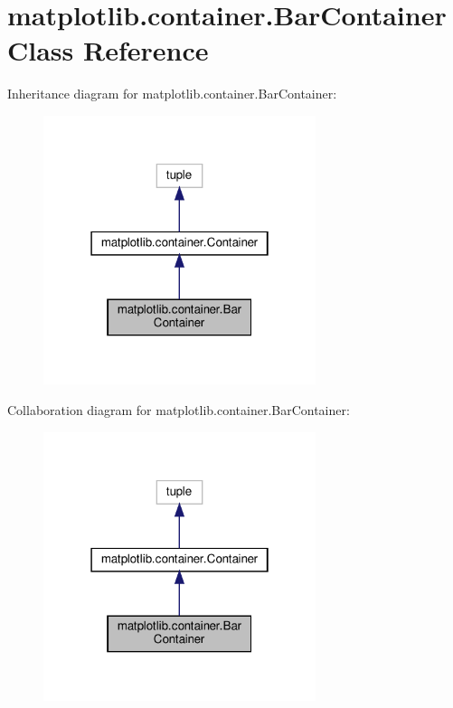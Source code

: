 \hypertarget{classmatplotlib_1_1container_1_1BarContainer}{}\section{matplotlib.\+container.\+Bar\+Container Class Reference}
\label{classmatplotlib_1_1container_1_1BarContainer}


Inheritance diagram for matplotlib.\+container.\+Bar\+Container\+:
\nopagebreak
\begin{figure}[H]
\begin{center}
\leavevmode
\includegraphics[width=226pt]{classmatplotlib_1_1container_1_1BarContainer__inherit__graph}
\end{center}
\end{figure}


Collaboration diagram for matplotlib.\+container.\+Bar\+Container\+:
\nopagebreak
\begin{figure}[H]
\begin{center}
\leavevmode
\includegraphics[width=226pt]{classmatplotlib_1_1container_1_1BarContainer__coll__graph}
\end{center}
\end{figure}
